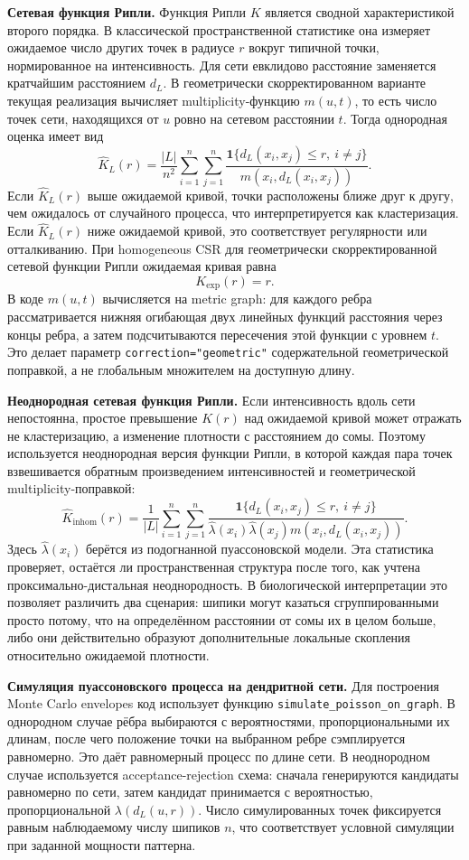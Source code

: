 \documentclass[12pt,a4paper]{article}
\begin{document}
\noindent\textbf{Сетевая функция Рипли.}
Функция Рипли \(K\) является сводной характеристикой второго порядка. В классической пространственной статистике она измеряет ожидаемое число других точек в радиусе \(r\) вокруг типичной точки, нормированное на интенсивность. Для сети евклидово расстояние заменяется кратчайшим расстоянием \(d_L\). В геометрически скорректированном варианте текущая реализация вычисляет multiplicity-функцию \(m(u,t)\), то есть число точек сети, находящихся от \(u\) ровно на сетевом расстоянии \(t\). Тогда однородная оценка имеет вид
\[
\hat K_L(r)=\frac{|L|}{n^2}\sum_{i=1}^{n}\sum_{j=1}^{n}
\frac{\mathbf{1}\{d_L(x_i,x_j)\leq r,\ i\neq j\}}{m(x_i,d_L(x_i,x_j))}.
\]
Если \(\hat K_L(r)\) выше ожидаемой кривой, точки расположены ближе друг к другу, чем ожидалось от случайного процесса, что интерпретируется как кластеризация. Если \(\hat K_L(r)\) ниже ожидаемой кривой, это соответствует регулярности или отталкиванию. При homogeneous CSR для геометрически скорректированной сетевой функции Рипли ожидаемая кривая равна
\[
K_{\mathrm{exp}}(r)=r.
\]
В коде \(m(u,t)\) вычисляется на metric graph: для каждого ребра рассматривается нижняя огибающая двух линейных функций расстояния через концы ребра, а затем подсчитываются пересечения этой функции с уровнем \(t\). Это делает параметр \texttt{correction="geometric"} содержательной геометрической поправкой, а не глобальным множителем на доступную длину.

\noindent\textbf{Неоднородная сетевая функция Рипли.}
Если интенсивность вдоль сети непостоянна, простое превышение \(K(r)\) над ожидаемой кривой может отражать не кластеризацию, а изменение плотности с расстоянием до сомы. Поэтому используется неоднородная версия функции Рипли, в которой каждая пара точек взвешивается обратным произведением интенсивностей и геометрической multiplicity-поправкой:
\[
\hat K_{\mathrm{inhom}}(r)=
\frac{1}{|L|}
\sum_{i=1}^{n}\sum_{j=1}^{n}
\frac{\mathbf{1}\{d_L(x_i,x_j)\leq r,\ i\neq j\}}
{\hat\lambda(x_i)\hat\lambda(x_j)m(x_i,d_L(x_i,x_j))}.
\]
Здесь \(\hat\lambda(x_i)\) берётся из подогнанной пуассоновской модели. Эта статистика проверяет, остаётся ли пространственная структура после того, как учтена проксимально-дистальная неоднородность. В биологической интерпретации это позволяет различить два сценария: шипики могут казаться сгруппированными просто потому, что на определённом расстоянии от сомы их в целом больше, либо они действительно образуют дополнительные локальные скопления относительно ожидаемой плотности.

\noindent\textbf{Симуляция пуассоновского процесса на дендритной сети.}
Для построения Monte Carlo envelopes код использует функцию \texttt{simulate\_poisson\_on\_graph}. В однородном случае рёбра выбираются с вероятностями, пропорциональными их длинам, после чего положение точки на выбранном ребре сэмплируется равномерно. Это даёт равномерный процесс по длине сети. В неоднородном случае используется acceptance-rejection схема: сначала генерируются кандидаты равномерно по сети, затем кандидат принимается с вероятностью, пропорциональной \(\lambda(d_L(u,r))\). Число симулированных точек фиксируется равным наблюдаемому числу шипиков \(n\), что соответствует условной симуляции при заданной мощности паттерна.
\end{document}
